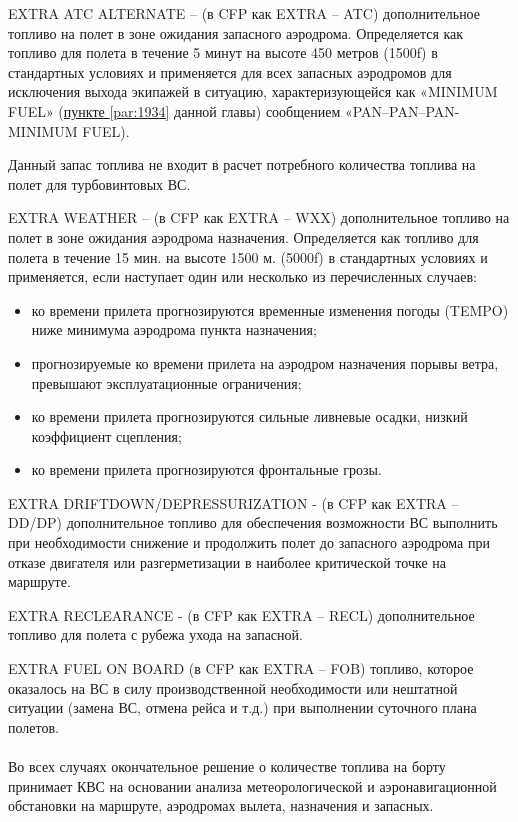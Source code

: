 EXTRA ATC ALTERNATE – (в CFP как EXTRA – ATC) дополнительное топливо на полет в зоне ожидания запасного аэродрома. Определяется как топливо для полета в течение 5 минут на высоте 450 метров (1500f) в стандартных условиях и применяется для всех запасных аэродромов для исключения выхода экипажей в ситуацию, характеризующейся как «MINIMUM FUEL» (\hyperref[par:1934]{пункте \ref*{par:1934}} данной главы) сообщением «PAN–PAN–PAN-MINIMUM FUEL).

Данный запас топлива не входит в расчет потребного количества топлива на полет для турбовинтовых ВС.

EXTRA WEATHER – (в CFP как EXTRA – WXX) дополнительное топливо на полет в зоне ожидания аэродрома назначения. Определяется как топливо для полета в течение 15 мин. на высоте 1500 м. (5000f) в стандартных условиях и применяется, если наступает один или несколько из перечисленных случаев: 
\begin{itemize}
    \item ко времени прилета прогнозируются временные изменения погоды (TEMPO) ниже минимума аэродрома пункта назначения;
    \item прогнозируемые ко времени прилета на аэродром назначения порывы ветра, превышают эксплуатационные ограничения;
    \item ко времени прилета прогнозируются сильные ливневые осадки, низкий коэффициент сцепления;
    \item ко времени прилета прогнозируются фронтальные грозы.
\end{itemize}
	 
EXTRA DRIFTDOWN/DEPRESSURIZATION - (в CFP как EXTRA – DD/DP) дополнительное топливо для обеспечения возможности ВС выполнить при необходимости снижение и продолжить полет до запасного аэродрома при отказе двигателя или разгерметизации в наиболее критической точке на маршруте.

EXTRA RECLEARANCE - (в CFP как EXTRA – RECL) дополнительное топливо для полета с рубежа ухода на запасной. 

EXTRA FUEL ON BOARD (в CFP как EXTRA – FOB) топливо, которое оказалось на ВС в силу производственной необходимости или нештатной ситуации (замена ВС, отмена рейса и т.д.) при выполнении суточного плана полетов. 

\paragraph{} Во всех случаях окончательное решение о количестве топлива на борту принимает КВС на основании анализа метеорологической и аэронавигационной обстановки на маршруте, аэродромах вылета, назначения и запасных. 

